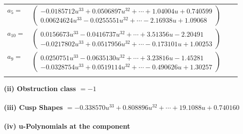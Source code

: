 \documentclass[1p]{elsarticle_modified}
\theoremstyle{definition}
\begin{document}
\begin{tabular}{m{7pt} m{180pt} m{7pt} m{180pt} }
\flushright $a_{5}=$&$\begin{pmatrix}-0.0185712 u^{33}+0.0506897 u^{32}+\cdots+1.04004 u+0.740599\\0.00624624 u^{33}-0.0255551 u^{32}+\cdots-2.16938 u+1.09068\end{pmatrix}$ \\
\flushright $a_{10}=$&$\begin{pmatrix}0.0156673 u^{33}-0.0416737 u^{32}+\cdots+3.51356 u-2.20491\\-0.0217802 u^{33}+0.0517956 u^{32}+\cdots-0.173101 u+1.00253\end{pmatrix}$ \\
\flushright $a_{9}=$&$\begin{pmatrix}0.0250751 u^{33}-0.0635130 u^{32}+\cdots+3.23816 u-1.45281\\-0.0328754 u^{33}+0.0519114 u^{32}+\cdots-0.490626 u+1.30257\end{pmatrix}$\\&\end{tabular}
\flushleft \textbf{(ii) Obstruction class $= -1$}\\~\\
\flushleft \textbf{(iii) Cusp Shapes $= -0.338570 u^{33}+0.808896 u^{32}+\cdots+19.1088 u+0.740160$}\\~\\
\newpage\renewcommand{\arraystretch}{1}
\flushleft \textbf{(iv) u-Polynomials at the component}\newline \\
\end{document}
